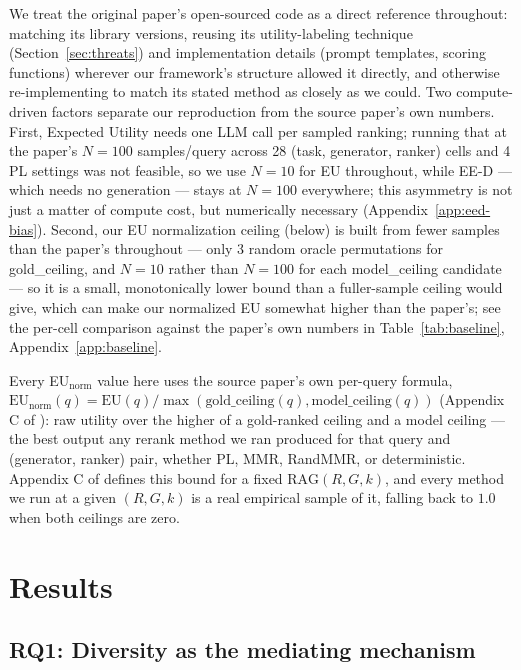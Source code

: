 \documentclass[10pt,twocolumn]{article}
\begin{document}
We treat the original paper's open-sourced code as a direct reference throughout:
matching its library versions, reusing its utility-labeling technique
(Section~\ref{sec:threats}) and implementation details (prompt templates, scoring
functions) wherever our framework's structure allowed it directly, and otherwise
re-implementing to match its stated method as closely as we could. Two
compute-driven factors separate our reproduction from the source paper's own
numbers. First, Expected Utility needs one LLM call per sampled ranking; running
that at the paper's $N{=}100$ samples/query across 28 (task, generator, ranker)
cells and 4 PL settings was not feasible, so we use $N{=}10$ for EU throughout,
while EE-D --- which needs no generation --- stays at $N{=}100$ everywhere; this
asymmetry is not just a matter of compute cost, but numerically necessary
(Appendix~\ref{app:eed-bias}). Second,
our EU normalization ceiling (below) is built from fewer samples than the
paper's throughout --- only 3 random oracle permutations for gold\_ceiling, and
$N{=}10$ rather than $N{=}100$ for each model\_ceiling candidate --- so it is a
small, monotonically lower bound than a fuller-sample ceiling would give, which
can make our normalized EU somewhat higher than the paper's; see the per-cell
comparison against the paper's own numbers in Table~\ref{tab:baseline},
Appendix~\ref{app:baseline}.

Every EU$_{\text{norm}}$ value here uses the source paper's own per-query formula,
$\text{EU}_{\text{norm}}(q){=}\text{EU}(q)/\max(\text{gold\_ceiling}(q),
\text{model\_ceiling}(q))$ (Appendix C of \cite{eunkim2025fairrag}): raw utility
over the higher of a gold-ranked ceiling and a model ceiling --- the best output
any rerank method we ran produced for that query and (generator, ranker) pair,
whether PL, MMR, RandMMR, or deterministic. Appendix C of \cite{eunkim2025fairrag}
defines this bound for a fixed $\text{RAG}(R,G,k)$, and every method we run at a
given $(R,G,k)$ is a real empirical sample of it, falling back to $1.0$ when both
ceilings are zero.

\section{Results}
\label{sec:results}

\subsection{RQ1: Diversity as the mediating mechanism}
\label{sec:rq1}
\end{document}
